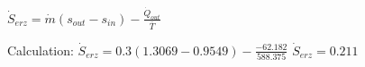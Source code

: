 \( \dot{S}_{erz} = \dot{m} (s_{out} - s_{in}) - \frac{\dot{Q}_{out}}{\bar{T}} \)  

Calculation:  
\( \dot{S}_{erz} = 0.3 (1.3069 - 0.9549) - \frac{-62.182}{588.375} \)  
\( \dot{S}_{erz} = 0.211 \)